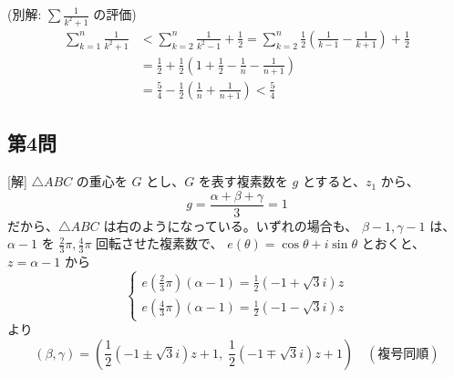 \documentclass[../main.tex]{subfiles}
\begin{document}
(別解: $\sum \frac{1}{k^2+1}$ の評価)
\begin{align*}
  \sum_{k=1}^n \frac{1}{k^2+1} &< \sum_{k=2}^n \frac{1}{k^2-1} + \frac{1}{2} = \sum_{k=2}^n \frac{1}{2} \left( \frac{1}{k-1} - \frac{1}{k+1} \right) + \frac{1}{2} \\
  &= \frac{1}{2} + \frac{1}{2} \left( 1 + \frac{1}{2} - \frac{1}{n} - \frac{1}{n+1} \right) \\
  &= \frac{5}{4} - \frac{1}{2} \left( \frac{1}{n} + \frac{1}{n+1} \right) < \frac{5}{4}
\end{align*}

\subsection*{第4問}
[解] $\triangle ABC$ の重心を $G$ とし、$G$ を表す複素数を $g$ とすると、$z_1$ から、
$$ g = \frac{\alpha + \beta + \gamma}{3} = 1 $$
だから、$\triangle ABC$ は右のようになっている。いずれの場合も、
$\beta - 1, \gamma - 1$ は、$\alpha - 1$ を $\frac{2}{3}\pi, \frac{4}{3}\pi$ 回転させた複素数で、
$e(\theta) = \cos \theta + i \sin \theta$ とおくと、$z = \alpha - 1$ から
$$
\begin{cases} e\left(\frac{2}{3}\pi\right) (\alpha - 1) = \frac{1}{2}(-1 + \sqrt{3}i)z \\ e\left(\frac{4}{3}\pi\right) (\alpha - 1) = \frac{1}{2}(-1 - \sqrt{3}i)z
\end{cases} $$
より
$$ (\beta, \gamma) = \left( \frac{1}{2}(-1 \pm \sqrt{3}i)z + 1 , \; \frac{1}{2}(-1 \mp \sqrt{3}i)z + 1 \right) \quad (\text{複号同順}) $$

\begin{center}
\end{center}
\end{document}

